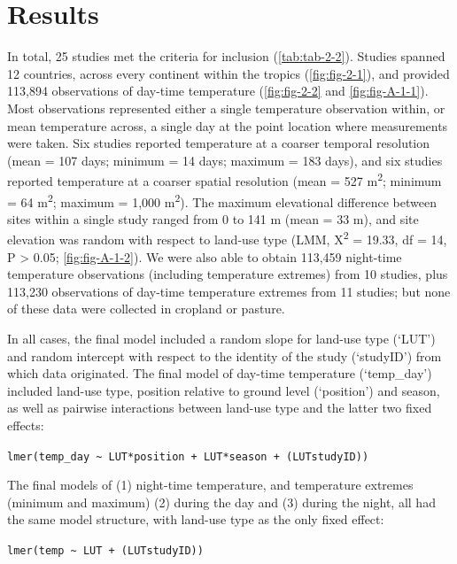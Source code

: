 \documentclass[12pt,a4paper,]{report}
\theoremstyle{definition}
\theoremstyle{definition}
\theoremstyle{definition}
\theoremstyle{remark}
\begin{document}
\section{Results}\label{results}

In total, 25 studies met the criteria for inclusion
(\autoref{tab:tab-2-2}). Studies spanned 12 countries, across every
continent within the tropics (\autoref{fig:fig-2-1}), and provided
113,894 observations of day-time temperature (\autoref{fig:fig-2-2} and
\autoref{fig:fig-A-1-1}). Most observations represented either a single
temperature observation within, or mean temperature across, a single day
at the point location where measurements were taken. Six studies
reported temperature at a coarser temporal resolution (mean = 107 days;
minimum = 14 days; maximum = 183 days), and six studies reported
temperature at a coarser spatial resolution (mean = 527
m\textsuperscript{2}; minimum = 64 m\textsuperscript{2}; maximum = 1,000
m\textsuperscript{2}). The maximum elevational difference between sites
within a single study ranged from 0 to 141 m (mean = 33 m), and site
elevation was random with respect to land-use type (LMM,
Χ\textsuperscript{2} = 19.33, df = 14, P \textgreater{} 0.05;
\autoref{fig:fig-A-1-2}). We were also able to obtain 113,459 night-time
temperature observations (including temperature extremes) from 10
studies, plus 113,230 observations of day-time temperature extremes from
11 studies; but none of these data were collected in cropland or
pasture.

In all cases, the final model included a random slope for land-use type
(`LUT') and random intercept with respect to the identity of the study
(`studyID') from which data originated. The final model of day-time
temperature (`temp\_day') included land-use type, position relative to
ground level (`position') and season, as well as pairwise interactions
between land-use type and the latter two fixed effects:

\texttt{lmer(temp\_day\ \textasciitilde{}\ LUT*position\ +\ LUT*season\ +\ (LUT\textbar{}studyID))}

The final models of (1) night-time temperature, and temperature extremes
(minimum and maximum) (2) during the day and (3) during the night, all
had the same model structure, with land-use type as the only fixed
effect:

\texttt{lmer(temp\ \textasciitilde{}\ LUT\ +\ (LUT\textbar{}studyID))}
\end{document}
